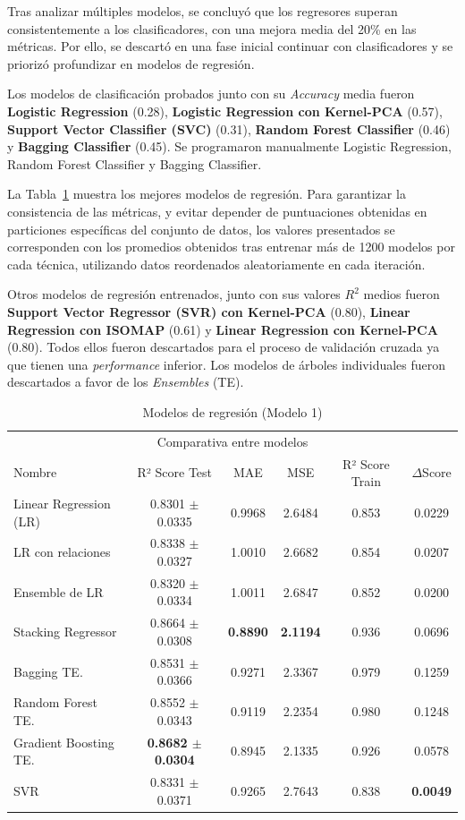 \documentclass{article}
\begin{document}
Tras analizar múltiples modelos, se concluyó que los regresores superan consistentemente a los clasificadores, con una mejora media del 20\% en las métricas. Por ello, se descartó en una fase inicial continuar con clasificadores y se priorizó profundizar en modelos de regresión.

Los modelos de clasificación probados junto con su \textit{Accuracy} media fueron \textbf{Logistic Regression} (0.28), \textbf{Logistic Regression con Kernel-PCA} (0.57), \textbf{Support Vector Classifier (SVC)} (0.31), \textbf{Random Forest Classifier} (0.46) y  \textbf{Bagging Classifier} (0.45). 
Se programaron manualmente Logistic Regression, Random Forest Classifier y  Bagging Classifier.

La Tabla~\ref{table-M1} muestra los mejores modelos de regresión. Para garantizar la consistencia de las métricas, y evitar depender de puntuaciones obtenidas en particiones específicas del conjunto de datos, los valores presentados se corresponden con los promedios obtenidos tras entrenar más de 1200 modelos por cada técnica, utilizando datos reordenados aleatoriamente en cada iteración.

Otros modelos de regresión entrenados, junto con sus valores \textit{$R^2$} medios fueron \textbf{Support Vector Regressor (SVR) con Kernel-PCA} (0.80), \textbf{Linear Regression con ISOMAP} (0.61) y \textbf{Linear Regression con Kernel-PCA} (0.80). Todos ellos fueron descartados para el proceso de validación cruzada ya que tienen una \textit{performance} inferior.
Los modelos de árboles individuales fueron descartados a favor de los \textit{Ensembles} (TE).

\begin{table}[H]
  \caption{Modelos de regresión (Modelo 1)}
  \label{table-M1}
  \centering
  \begin{tabular}{lccccc}
    \toprule
    \multicolumn{6}{c}{Comparativa entre modelos} \\
    \cmidrule(r){1-6}
    Nombre & R² Score Test & MAE & MSE & R² Score Train & $\Delta$Score \\
    \midrule
    Linear Regression (LR)  & 0.8301 $\pm$ 0.0335 & 0.9968 & 2.6484 & 0.853 & 0.0229\\
    LR con relaciones   & 0.8338 $\pm$ 0.0327 & 1.0010 & 2.6682 & 0.854 & 0.0207 \\
    Ensemble de LR      & 0.8320 $\pm$ 0.0334 & 1.0011 & 2.6847 & 0.852 & 0.0200\\
    Stacking Regressor  & 0.8664 $\pm$ 0.0308 & \textbf{0.8890} & \textbf{2.1194} & 0.936 & 0.0696\\
    Bagging TE.         & 0.8531 $\pm$ 0.0366 & 0.9271 & 2.3367 & 0.979 & 0.1259\\
    Random Forest TE.   & 0.8552 $\pm$ 0.0343 & 0.9119 & 2.2354 & 0.980 & 0.1248\\
    Gradient Boosting TE.& \textbf{0.8682 $\pm$ 0.0304} & 0.8945 & 2.1335 & 0.926 & 0.0578\\
    SVR                 & 0.8331 $\pm$ 0.0371 & 0.9265 & 2.7643 & 0.838 & \textbf{0.0049}\\
    \bottomrule
  \end{tabular}
\end{table}
\end{document}
